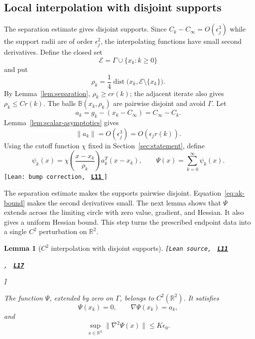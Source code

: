 \documentclass[11pt]{article}
\newtheorem{lemma}[theorem]{Lemma}
\newcommand{\R}{\mathbb R}
\newcommand{\leanLinkText}[1]{%
  \underline{\textbf{#1}}%
}
\newcommand{\leanSnapshot}{e308927f5b7930bdd002f0c0e42b9d112ad821cb}
\newcommand{\leanDeclTag}[2]{%
  {\footnotesize\texttt{[Lean source, }}%
  \href{https://github.com/imathwy/DFP_wolfe_local/blob/\leanSnapshot/#1?plain=1\#L#2}%
    {\leanLinkText{\footnotesize\texttt{L#2}}}%
}
\newcommand{\leanDeclTagExtra}[2]{%
  \unskip
  {\footnotesize\texttt{, }}%
  \href{https://github.com/imathwy/DFP_wolfe_local/blob/\leanSnapshot/#1?plain=1\#L#2}%
    {\leanLinkText{\footnotesize\texttt{L#2}}}\allowbreak
}
\newcommand{\leanDeclTagEnd}{%
  \unskip
  {\footnotesize\texttt{]}}\enspace
}
\newcommand{\leanClaimTag}[3]{%
  {\footnotesize\texttt{[Lean: #1, }}%
  \href{https://github.com/imathwy/DFP_wolfe_local/blob/\leanSnapshot/#2?plain=1\#L#3}%
    {\leanLinkText{\footnotesize\texttt{L#3}}}%
  {\footnotesize\texttt{]}}\enspace
}
\begin{document}
\subsection{Local interpolation with disjoint supports}

The separation estimate gives disjoint supports.  Since
$C_k-C_\infty=O(\epsilon_j^3)$ while the support radii are of order
$\epsilon_j^2$, the interpolating functions have small second derivatives.
Define the closed set
\[
\mathcal E=\Gamma\cup\{x_k:k\ge0\}
\]
and put
\begin{equation}\label{eq:rho-k}
\rho_k=\frac14\operatorname{dist}
\bigl(x_k,\mathcal E\setminus\{x_k\}\bigr).
\end{equation}
By Lemma~\ref{lem:separation}, $\rho_k\ge c r(k)$; the adjacent iterate
also gives $\rho_k\le Cr(k)$.  The balls
$\mathbb B(x_k,\rho_k)$ are pairwise disjoint and avoid $\Gamma$.  Let
\begin{equation}\label{eq:correction-vector}
a_k=g_k-(x_k-C_\infty)=C_\infty-C_k.
\end{equation}
Lemma~\ref{lem:scalar-asymptotics} gives
\begin{equation}\label{eq:ak-bound}
\|a_k\|=O(\epsilon_j^3)=O(\epsilon_jr(k)).
\end{equation}
Using the cutoff function $\chi$ fixed in Section~\ref{sec:statement}, define
\begin{equation}\label{eq:local-interpolants}
\psi_k(x)=
\chi\!\left(\frac{x-x_k}{\rho_k}\right)a_k^T(x-x_k),
\qquad
\Psi(x)=\sum_{k=0}^\infty\psi_k(x).
\end{equation}
\leanClaimTag{bump correction}{DFPWolfe/A_uniformly_convex_counterexample_to_global_convergence_of_DFP_under_weak_Wolfe_/Definition_5_3_Disjoint_endpoint_bump_corrections.lean}{11}

The separation estimate makes the supports pairwise disjoint.
Equation~\eqref{eq:ak-bound} makes the second derivatives small.  The next
lemma shows that $\Psi$ extends across the limiting circle with zero value,
gradient, and Hessian.  It also gives a uniform Hessian bound.  This step turns
the prescribed endpoint data into a single $C^2$ perturbation on $\R^2$.

\begin{lemma}[$C^2$ interpolation with disjoint supports]
\label{lem:disjoint-interpolation}
\leanDeclTag{DFPWolfe/A_uniformly_convex_counterexample_to_global_convergence_of_DFP_under_weak_Wolfe_/Lemma_Disjoint_bump_extension.lean}{11}
\leanDeclTagExtra{DFPWolfe/A_uniformly_convex_counterexample_to_global_convergence_of_DFP_under_weak_Wolfe_/Proposition_5_13_Exact_endpoint_value_and_gradient_interpolation.lean}{17}
\leanDeclTagEnd
The function $\Psi$, extended by zero on $\Gamma$, belongs to
$C^2(\R^2)$.  It satisfies
\begin{equation}\label{eq:interpolation-jets}
\Psi(x_k)=0,\qquad \nabla\Psi(x_k)=a_k,
\end{equation}
and
\begin{equation}\label{eq:interpolation-hessian-bound}
\sup_{x\in\R^2}\|\nabla^2\Psi(x)\|
\le K\epsilon_0.
\end{equation}
\end{lemma}
\end{document}
